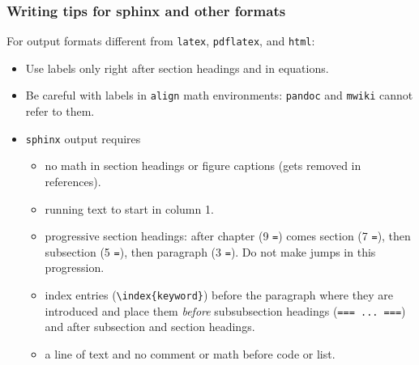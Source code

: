 \documentclass{beamer}
\begin{document}
\begin{frame}
\frametitle{Writing tips for sphinx and other formats}

For output formats different from \Verb!latex!, \Verb!pdflatex!, and \Verb!html!:

\begin{itemize}
 \item Use labels only right after section headings and in equations.

 \item Be careful with labels in \Verb!align! math environments: \Verb!pandoc!
   and \Verb!mwiki! cannot refer to them.

 \item \Verb!sphinx! output requires
\begin{itemize}

   \item no math in section headings or figure captions
     (gets removed in references).

   \item running text to start in column 1.

   \item progressive section headings: after chapter (9 \Verb!=!) comes
     section (7 \Verb!=!), then subsection (5 \Verb!=!), then paragraph
     (3 \Verb!=!). Do not make jumps in this progression.

   \item index entries (\Verb!\index{keyword}!) before the paragraph where they
     are introduced and place them \emph{before} subsubsection
     headings (\Verb!=== ... ===!) and after subsection and section headings.

   \item a line of text and no comment or math before code or list.
\end{itemize}

\noindent
\end{itemize}

\noindent
\end{frame}
\end{document}
